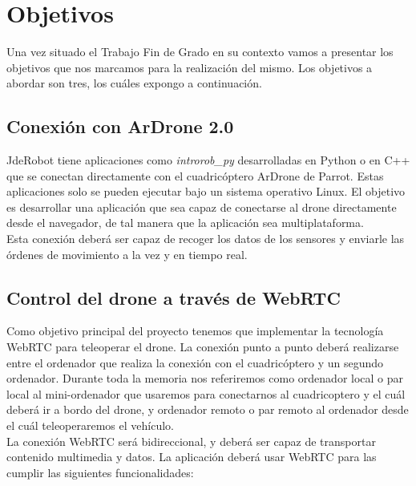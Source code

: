 \chapter{Objetivos}

Una vez situado el Trabajo Fin de Grado en su contexto vamos a presentar los objetivos que nos marcamos para la realización del mismo. Los objetivos a abordar son tres, los cuáles expongo a continuación.


\section{Conexión con ArDrone 2.0}

JdeRobot tiene aplicaciones  como \emph{introrob\_py} desarrolladas en Python o en C++ que se conectan directamente con el cuadricóptero ArDrone de Parrot. Estas aplicaciones solo se pueden ejecutar bajo un sistema operativo Linux. El objetivo es desarrollar una aplicación que sea capaz de conectarse al drone directamente desde el navegador, de tal manera que la aplicación sea multiplataforma.\\

Esta conexión deberá ser capaz de recoger los datos de los sensores y enviarle las órdenes de movimiento a la vez y en tiempo real.\\


\section{Control del drone a través de WebRTC}

Como objetivo principal del proyecto tenemos que implementar la tecnología WebRTC para teleoperar el drone. La conexión punto a punto deberá realizarse entre el ordenador que realiza la conexión con el cuadricóptero y un segundo ordenador. Durante toda la memoria nos referiremos como ordenador local o par local al mini-ordenador que usaremos para conectarnos al cuadricoptero y el cuál deberá ir a bordo del drone, y ordenador remoto o par remoto al ordenador desde el cuál teleoperaremos el vehículo.\\

La conexión WebRTC será bidireccional, y deberá ser capaz de transportar contenido multimedia y datos. La aplicación deberá usar WebRTC para las cumplir las siguientes funcionalidades:


